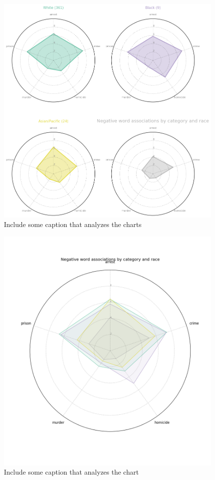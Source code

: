 \documentclass[sigconf]{acmart}
\begin{document}
\begin{figure}
\includegraphics[width=\columnwidth]{images/fig3.png}
\caption{Include some caption that analyzes the charts}
\label{Figure 3}
\end{figure}

\begin{figure}
\includegraphics[width=\columnwidth]{images/fig4.png}
\caption{Include some caption that analyzes the chart}
\label{Figure 4}
\end{figure}
\end{document}
